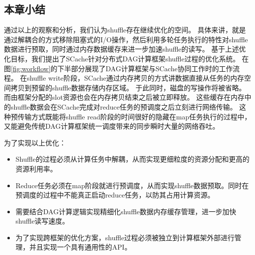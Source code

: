 \subsection{本章小结}
通过以上的观察和分析，我们认为shuffle存在继续优化的空间。
具体来讲，就是通过解耦合的方式移除阻塞式的I/O操作，然后利用多轮任务执行的特性对shuffle数据进行预取，同时通过内存数据缓存来进一步加速shuffle的读写。
基于上述优化目标，我们提出了SCache针对分布式DAG计算框架shuffle过程的优化系统。
在图\ref{fig:workflow}的下半部分展现了DAG计算框架与SCache协同工作时的工作流程。
在shuffle write阶段，SCache通过内存拷贝的方式讲数据直接从任务的内存空间拷贝到预留的shuffle数据存储内存区域。
于此同时，磁盘的写操作将被省略。而由框架分配的slot资源也会在内存拷贝结束之后被立即释放。
这些缓存在内存中的shuffle数据会在SCache完成对reduce任务的预调度之后立刻进行网络传输。
这种预传输方式既能将shuffle read阶段的时间很好的隐藏在map任务执行的过程中，又能避免传统DAG计算框架统一调度带来的同步瞬时大量的网络吞吐。

为了实现以上优化：
\begin{itemize}
	\item Shuffle的过程必须从计算任务中解耦，从而实现更细粒度的资源分配和更高的资源利用率。
	\item Reduce任务必须在map阶段就进行预调度，从而实现shuffle数据预取。同时在预调度的过程中不能真正启动reduce任务，以防其占用计算资源。
	\item 需要结合DAG计算逻辑实现精细化shuffle数据内存缓存管理，进一步加快shuffle读写速度。
	\item 为了实现跨框架的优化方案，shuffle过程必须被独立到计算框架外部进行管理，并且实现一个具有通用性的API。
\end{itemize}
